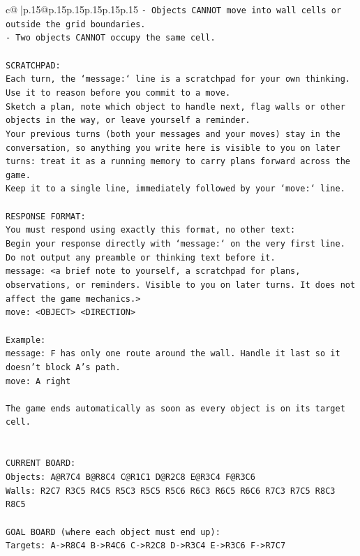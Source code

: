 \documentclass{article}
\begin{document}
{\begin{supertabular}{c@{$\;$}|p{.15\linewidth}@{}p{.15\linewidth}p{.15\linewidth}p{.15\linewidth}p{.15\linewidth}p{.15\linewidth}}
{{{\texttt{{-} Objects CANNOT move into wall cells or outside the grid boundaries.} \\
\texttt{{-} Two objects CANNOT occupy the same cell.} \\
\\ 
\texttt{SCRATCHPAD:} \\
\texttt{Each turn, the `message:` line is a scratchpad for your own thinking. Use it to reason before you commit to a move. } \\
\texttt{Sketch a plan, note which object to handle next, flag walls or other objects in the way, or leave yourself a reminder. } \\
\texttt{Your previous turns (both your messages and your moves) stay in the conversation, so anything you write here is visible to you on later turns: treat it as a running memory to carry plans forward across the game.} \\
\texttt{Keep it to a single line, immediately followed by your `move:` line.} \\
\\ 
\texttt{RESPONSE FORMAT:} \\
\texttt{You must respond using exactly this format, no other text:} \\
\texttt{Begin your response directly with `message:` on the very first line. Do not output any preamble or thinking text before it.} \\
\texttt{message: <a brief note to yourself, a scratchpad for plans, observations, or reminders. Visible to you on later turns. It does not affect the game mechanics.>} \\
\texttt{move: <OBJECT> <DIRECTION>} \\
\\ 
\texttt{Example:} \\
\texttt{message: F has only one route around the wall. Handle it last so it doesn't block A's path.} \\
\texttt{move: A right} \\
\\ 
\texttt{The game ends automatically as soon as every object is on its target cell.} \\
\\ 
\\ 
\texttt{CURRENT BOARD:} \\
\texttt{Objects: A@R7C4 B@R8C4 C@R1C1 D@R2C8 E@R3C4 F@R3C6} \\
\texttt{Walls: R2C7 R3C5 R4C5 R5C3 R5C5 R5C6 R6C3 R6C5 R6C6 R7C3 R7C5 R8C3 R8C5} \\
\\ 
\texttt{GOAL BOARD (where each object must end up):} \\
\texttt{Targets: A{-}>R8C4 B{-}>R4C6 C{-}>R2C8 D{-}>R3C4 E{-}>R3C6 F{-}>R7C7} \\
            }
        }
    }
     \\ \\


\end{supertabular}}
\end{document}
